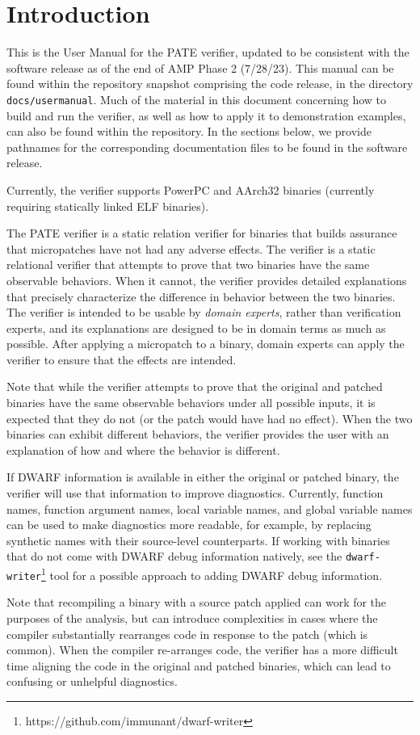 \section{Introduction}\label{sec:introduction}

This is the User Manual for the PATE verifier, updated to be consistent
with the software release as of the end of AMP Phase 2 (7/28/23).  This
manual can be found within the repository snapshot comprising the code
release, in the directory \texttt{docs/usermanual}.  Much of the
material in this document concerning how to build and run the verifier,
as well as how to apply it to demonstration examples, can also be found
within the repository.  In the sections below, we provide pathnames for
the corresponding documentation files to be found in the software
release.

Currently, the verifier supports PowerPC and AArch32 binaries (currently
requiring statically linked ELF binaries).

The PATE verifier is a static relation verifier for binaries that builds
assurance that micropatches have not had any adverse effects.  The
verifier is a static relational verifier that attempts to prove that two
binaries have the same observable behaviors.  When it cannot, the
verifier provides detailed explanations that precisely characterize the
difference in behavior between the two binaries.  The verifier is
intended to be usable by \emph{domain experts}, rather than verification
experts, and its explanations are designed to be in domain terms as much
as possible.  After applying a micropatch to a binary, domain experts
can apply the verifier to ensure that the effects are intended.

Note that while the verifier attempts to prove that the original and patched
binaries have the same observable behaviors under all possible inputs,
it is expected that they do not (or the patch would have had no effect).
When the two binaries can exhibit different behaviors, the verifier
provides the user with an explanation of how and where the behavior is different.

If DWARF information is available in either the original or patched
binary, the verifier will use that information to improve diagnostics.
Currently, function names, function argument names, local variable
names, and global variable names can be used to make diagnostics more
readable, for example, by replacing synthetic names with their
source-level counterparts.  If working with binaries that do not come
with DWARF debug information natively, see the
\lstinline{dwarf-writer}\footnote{https://github.com/immunant/dwarf-writer}
tool for a possible approach to adding DWARF debug information.

Note that recompiling a binary with a source patch applied can work for
the purposes of the analysis, but can introduce complexities in cases
where the compiler substantially rearranges code in response to the
patch (which is common).  When the compiler re-arranges code, the
verifier has a more difficult time aligning the code in the original and
patched binaries, which can lead to confusing or unhelpful diagnostics.
